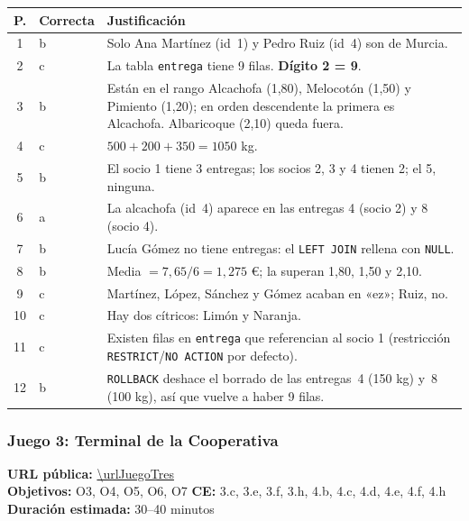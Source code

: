 \documentclass[11pt,a4paper]{article}
\begin{document}
\begin{solucion}
\begin{tabularx}{\linewidth}{@{}clX@{}}
\toprule
\textbf{P.} & \textbf{Correcta} & \textbf{Justificación} \\
\midrule
1  & b & Solo Ana Martínez (id~1) y Pedro Ruiz (id~4) son de Murcia. \\
2  & c & La tabla \texttt{entrega} tiene 9 filas. \textbf{Dígito 2 = 9}. \\
3  & b & Están en el rango Alcachofa (1,80), Melocotón (1,50) y Pimiento (1,20); en orden descendente
         la primera es Alcachofa. Albaricoque (2,10) queda fuera. \\
4  & c & $500 + 200 + 350 = 1050$ kg. \\
5  & b & El socio 1 tiene 3 entregas; los socios 2, 3 y 4 tienen 2; el 5, ninguna. \\
6  & a & La alcachofa (id~4) aparece en las entregas 4 (socio 2) y 8 (socio 4). \\
7  & b & Lucía Gómez no tiene entregas: el \texttt{LEFT JOIN} rellena con \texttt{NULL}. \\
8  & b & Media $= 7{,}65/6 = 1{,}275$ €; la superan 1,80, 1,50 y 2,10. \\
9  & c & Martínez, López, Sánchez y Gómez acaban en «ez»; Ruiz, no. \\
10 & c & Hay dos cítricos: Limón y Naranja. \\
11 & c & Existen filas en \texttt{entrega} que referencian al socio 1 (restricción
         \texttt{RESTRICT}/\texttt{NO ACTION} por defecto). \\
12 & b & \texttt{ROLLBACK} deshace el borrado de las entregas~4 (150 kg) y~8 (100 kg),
         así que vuelve a haber 9 filas. \\
\bottomrule
\end{tabularx}
\end{solucion}

\subsubsection{Juego 3: Terminal de la Cooperativa}
\label{sec:juego3}

\begin{nota}
\textbf{URL pública:} \url{\urlJuegoTres}\\
\textbf{Objetivos:} O3, O4, O5, O6, O7 \quad
\textbf{CE:} 3.c, 3.e, 3.f, 3.h, 4.b, 4.c, 4.d, 4.e, 4.f, 4.h \quad
\textbf{Duración estimada:} 30–40 minutos
\end{nota}
\end{document}
